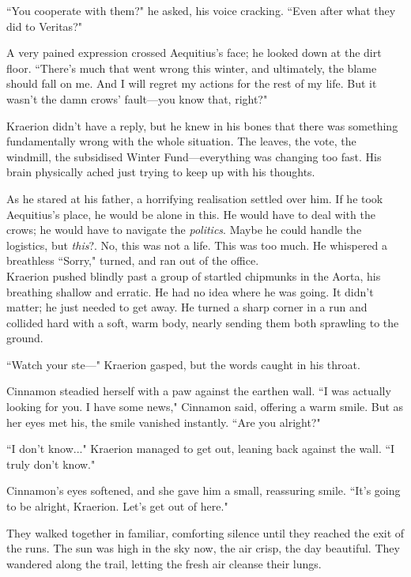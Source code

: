 ``You cooperate with them?" he asked, his voice cracking.
``Even after what they did to Veritas?"

A very pained expression crossed Aequitius's face; he looked down at the dirt floor.
``There's much that went wrong this winter, and ultimately, the blame should fall on me.
And I will regret my actions for the rest of my life.
But it wasn't the damn crows' fault---you know that, right?"

Kraerion didn't have a reply, but he knew in his bones that there was something fundamentally wrong with the whole situation.
The leaves, the vote, the windmill, the subsidised Winter Fund---everything was changing too fast.
His brain physically ached just trying to keep up with his thoughts.

As he stared at his father, a horrifying realisation settled over him.
If he took Aequitius's place, he would be alone in this.
He would have to deal with the crows; he would have to navigate the \textit{politics}.
Maybe he could handle the logistics, but \textit{this}?.
No, this was not a life.
This was too much.
He whispered a breathless ``Sorry," turned, and ran out of the office.\\

Kraerion pushed blindly past a group of startled chipmunks in the Aorta, his breathing shallow and erratic.
He had no idea where he was going.
It didn't matter; he just needed to get away.
He turned a sharp corner in a run and collided hard with a soft, warm body, nearly sending them both sprawling to the ground.

``Watch your ste---" Kraerion gasped, but the words caught in his throat.

Cinnamon steadied herself with a paw against the earthen wall.
``I was actually looking for you.
I have some news," Cinnamon said, offering a warm smile.
But as her eyes met his, the smile vanished instantly.
``Are you alright?"

``I don't know..." Kraerion managed to get out, leaning back against the wall.
``I truly don't know."

Cinnamon's eyes softened, and she gave him a small, reassuring smile.
``It's going to be alright, Kraerion.
Let's get out of here."

They walked together in familiar, comforting silence until they reached the exit of the runs.
The sun was high in the sky now, the air crisp, the day beautiful.
They wandered along the trail, letting the fresh air cleanse their lungs.

